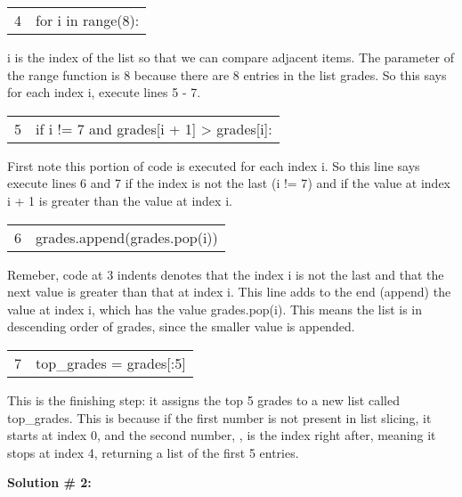 \documentclass{article}
\newcommand{\icode}[1]{{\ttfamily #1}}
\newenvironment{code}{\begin{tcolorbox}\ttfamily}{\end{tcolorbox}}
\begin{document}
\begin{code}
	\begin{tabular}{l|l}
		4&\hspace{2 em}for i in range(8):
	\end{tabular}
\end{code}
\icode{i} is the index of the list so that we can compare adjacent items. The parameter of the range function is 8 because there are 8 entries in the list \icode{grades}. So this says for each index \icode{i}, execute lines 5 - 7.

\begin{code}
	\begin{tabular}{l|l}
		5&\hspace{4 em}if i != 7 and grades[i + 1] > grades[i]:
	\end{tabular}
\end{code}
First note this portion of code is executed for each index \icode{i}. So this line says execute lines 6 and 7 if the index is not the last (\icode{i != 7}) and if the value at index \icode{i + 1} is greater than the value at index \icode{i}.

\begin{code}
	\begin{tabular}{l|l}
		6& \hspace{6 em}grades.append(grades.pop(i))\\
	\end{tabular}
\end{code}
Remeber, code at 3 indents denotes that the index \icode{i} is not the last and that the next value is greater than that at index \icode{i}. This line adds to the end (append) the value at index \icode{i}, which has the value \icode{grades.pop(i)}. This means the list is in descending order of grades, since the smaller value is appended.

\begin{code}
	\begin{tabular}{l|l}
		7& top\_grades = grades[:5]
	\end{tabular}
\end{code}
This is the finishing step: it assigns the top 5 grades to a new list called \icode{top\_grades}. This is because if the first number is not present in list slicing, it starts at index 0, and the second number, \icode{5}, is the index right after, meaning it stops at index 4, returning a list of the first 5 entries.

\newpage
\noindent\textbf{Solution \# 2:}
\end{document}
